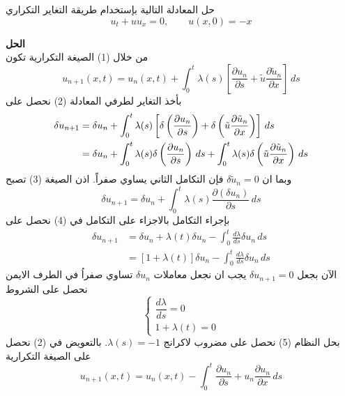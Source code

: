 \begin{example}
	حل المعادلة التالية بإستخدام طريقة التغاير التكراري
	\[
	u_t + u u_x = 0 , \qquad u(x, 0) = -x
 	\]
\end{example}
\noindent
\textbf{الحل}\\
\noindent
من خلال (1) الصيغة التكرارية تكون 
\begin{equation}
u_{n+1}(x, t) = u_n(x, t) + \int_{0}^{t} \lambda(s) \left[\frac{\partial u_n}{\partial s} + \tilde{u}  \frac{\partial \tilde{u}_n}{\partial x}\right] \, ds 
\end{equation}
بأخذ التغاير لطرفي المعادلة (2) نحصل على
\begin{align}
	\delta u_{n+1} &= \delta u_n + \int_{0}^{t} \lambda(s) \left[\delta\left(\frac{\partial u_n}{\partial s}\right) + \delta \left(\tilde{u}  \frac{\partial \tilde{u}_n}{\partial x}\right)\right]\, ds\notag\\
	&= \delta u_n + \int_{0}^t \lambda(s) \delta\left(\frac{\partial u_n}{\partial s}\right) \, ds + \int_{0}^{t} \lambda(s) \delta \left(\tilde{u}  \frac{\partial \tilde{u}_n}{\partial x}\right) \, ds
\end{align}
وبما ان $\delta\tilde{u}_n = 0$ فإن التكامل الثاني يساوي صفراً. اذن الصيغة (3) تصبح 
\begin{equation}
	\delta u_{n+1} = \delta u_n + \int_{0}^{t} \lambda(s) \frac{\partial(\delta u_n)}{\partial s} \, ds
\end{equation} 
بإجراء التكامل بالاجزاء على التكامل في (4) نحصل على
\begin{align*}
	\delta u_{n+1} &= \delta u_n + \lambda(t) \delta u_n - \int_0^t \frac{d \lambda}{ds} \delta u_n \, ds\\
	&= [1 + \lambda(t)] \delta u_n - \int_0^t \frac{d \lambda}{ds} \delta u_n \, ds
\end{align*}
الآن بجعل $\delta u_{n+1} = 0$ يجب ان نجعل معاملات $\delta u_n$ تساوي صفراُ في الطرف الايمن نحصل على الشروط
\begin{equation}
	\begin{cases}
	\dfrac{d \lambda}{ds} = 0 \\
	1 + \lambda(t) = 0
\end{cases}
\end{equation}
بحل النظام (5) نحصل على مضروب لاكرانج $\lambda(s) = -1$. بالتعويض في (2) نحصل على الصيغة التكرارية 
\begin{equation}
	u_{n+1}(x, t) = u_n(x, t) - \int_{0}^{t} \frac{\partial u_n}{\partial s} + {u}_n  \frac{\partial {u}_n}{\partial x}\, ds 
\end{equation}
